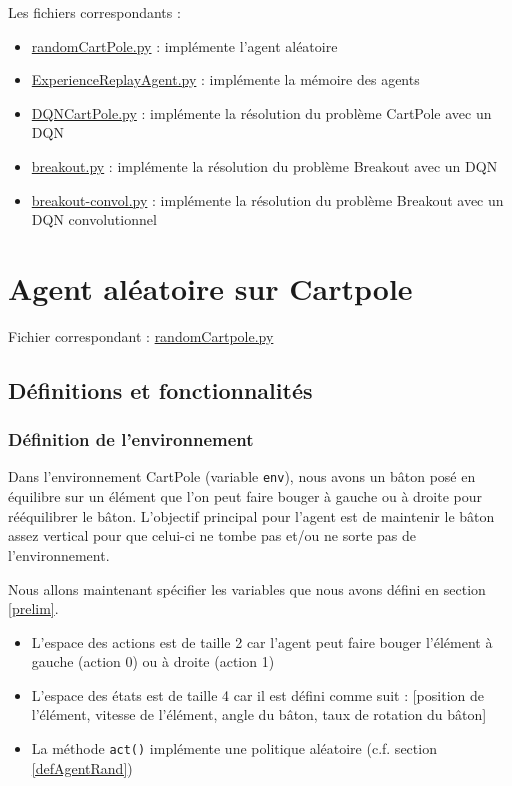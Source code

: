 \documentclass[10pt,a4paper]{article}
\begin{document}
Les fichiers correspondants :
\begin{itemize}
	\item \href{https://github.com/NellyBarret/IA5-TP-APR/blob/nelly/randomCartPole.py}{randomCartPole.py} : implémente l'agent aléatoire
	\item \href{https://github.com/NellyBarret/IA5-TP-APR/blob/nelly/ExperienceReplayAgent.py}{ExperienceReplayAgent.py} : implémente la mémoire des agents
	\item \href{https://github.com/NellyBarret/IA5-TP-APR/blob/nelly/DQNCartPole.py}{DQNCartPole.py} : implémente la résolution du problème CartPole avec un DQN
	\item \href{https://github.com/NellyBarret/IA5-TP-APR/blob/nelly/breakout.py}{breakout.py} : implémente la résolution du problème Breakout avec un DQN
	\item \href{https://github.com/NellyBarret/IA5-TP-APR/blob/nelly/breakout-convol.py}{breakout-convol.py} : implémente la résolution du problème Breakout avec un DQN convolutionnel
\end{itemize}


\section{Agent aléatoire sur Cartpole}

Fichier correspondant : \href{https://github.com/NellyBarret/IA5-TP-APR/blob/master/randomCartPole.py}{randomCartpole.py}

\subsection{Définitions et fonctionnalités}
\subsubsection{Définition de l'environnement}
Dans l'environnement CartPole (variable \lstinline{env}), nous avons un bâton posé en équilibre sur un élément que l'on peut faire bouger à gauche ou à droite pour rééquilibrer le bâton. L'objectif principal pour l'agent est de maintenir le bâton assez vertical pour que celui-ci ne tombe pas et/ou ne sorte pas de l'environnement.

Nous allons maintenant spécifier les variables que nous avons défini en section \ref{prelim}.
\begin{itemize}
	\item L'espace des actions est de taille 2 car l'agent peut faire bouger l'élément à gauche (action 0) ou à droite (action 1)
	\item L'espace des états est de taille 4 car il est défini comme suit : [position de l'élément, vitesse de l'élément, angle du bâton, taux de rotation du bâton]
	\item La méthode \lstinline{act()} implémente une politique aléatoire (c.f. section \ref{defAgentRand})
\end{itemize}
\end{document}
